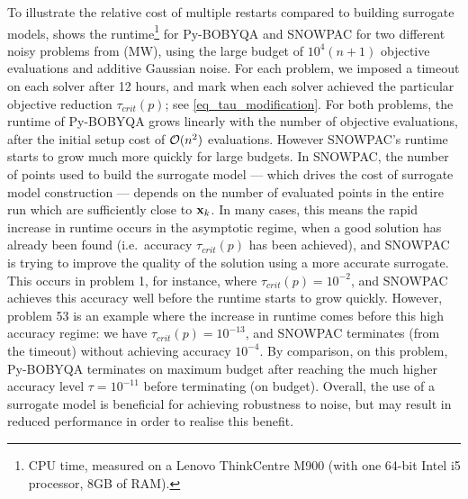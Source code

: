 To illustrate the relative cost of multiple restarts compared to building surrogate models,  shows the runtime\footnote{\:CPU time, measured on a Lenovo ThinkCentre M900 (with one 64-bit Intel i5 processor, 8GB of RAM).} for Py-BOBYQA and SNOWPAC for two different noisy problems from (MW), using the large budget of $10^4 (n+1)$ objective evaluations and additive Gaussian noise.
For each problem, we imposed a timeout on each solver after 12 hours, and mark when each solver achieved the particular objective reduction $\tau_{crit}(p)$; see \eqref{eq_tau_modification}.
For both problems, the runtime of Py-BOBYQA grows linearly with the number of objective evaluations, after the initial setup cost of $\mathcal{O}(n^2)$ evaluations.
However SNOWPAC's runtime starts to grow much more quickly for large budgets.
In SNOWPAC, the number of points used to build the surrogate model --- which drives the cost of surrogate model construction --- depends on the number of evaluated points in the entire run which are sufficiently close to $\mathbf{x}_k$.
In many cases, this means the rapid increase in runtime occurs in the asymptotic regime, when a good solution has already been found (i.e.~accuracy $\tau_{crit}(p)$ has been achieved), and SNOWPAC is trying to improve the quality of the solution using a more accurate surrogate.
This occurs in problem 1, for instance, where $\tau_{crit}(p)=10^{-2}$, and SNOWPAC achieves this accuracy well before the runtime starts to grow quickly.
However, problem 53 is an example where the increase in runtime comes before this high accuracy regime: we have $\tau_{crit}(p)=10^{-13}$, and SNOWPAC terminates (from the timeout) without achieving accuracy $10^{-4}$.
By comparison, on this problem, Py-BOBYQA terminates on maximum budget after reaching the much higher accuracy level $\tau=10^{-11}$ before terminating (on budget).
Overall, the use of a surrogate model is beneficial for achieving robustness to noise, but may result in reduced performance in order to realise this benefit.


